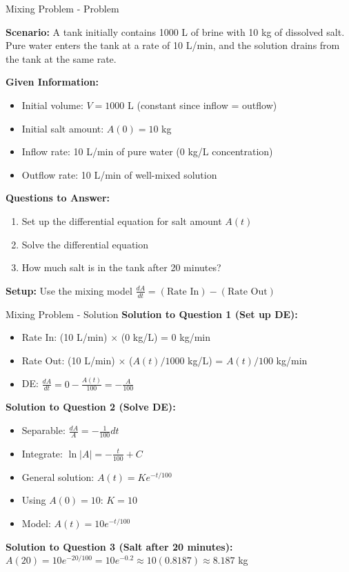 \documentclass[10pt,aspectratio=169]{beamer}
\begin{document}
\begin{frame}{Mixing Problem - Problem}
    \begin{problembox}
        \textbf{Scenario:} A tank initially contains 1000 L of brine with 10 kg of dissolved salt. Pure water enters the tank at a rate of 10 L/min, and the solution drains from the tank at the same rate.
        
        \textbf{Given Information:}
        \begin{itemize}
            \item Initial volume: $V = 1000$ L (constant since inflow = outflow)
            \item Initial salt amount: $A(0) = 10$ kg
            \item Inflow rate: 10 L/min of pure water (0 kg/L concentration)
            \item Outflow rate: 10 L/min of well-mixed solution
        \end{itemize}
        
        \textbf{Questions to Answer:}
        \begin{enumerate}
            \item Set up the differential equation for salt amount $A(t)$
            \item Solve the differential equation
            \item How much salt is in the tank after 20 minutes?
        \end{enumerate}
        
        \textbf{Setup:} Use the mixing model $\frac{dA}{dt} = (\text{Rate In}) - (\text{Rate Out})$
    \end{problembox}
\end{frame}

\begin{frame}{Mixing Problem - Solution}
    \textbf{Solution to Question 1 (Set up DE):}
    \begin{itemize}
        \item Rate In: (10 L/min) $\times$ (0 kg/L) = 0 kg/min
        \item Rate Out: (10 L/min) $\times$ ($A(t)/1000$ kg/L) = $A(t)/100$ kg/min
        \item DE: $\frac{dA}{dt} = 0 - \frac{A(t)}{100} = -\frac{A}{100}$
    \end{itemize}
    
    \textbf{Solution to Question 2 (Solve DE):}
    \begin{itemize}
        \item Separable: $\frac{dA}{A} = -\frac{1}{100} dt$
        \item Integrate: $\ln|A| = -\frac{t}{100} + C$
        \item General solution: $A(t) = Ke^{-t/100}$
        \item Using $A(0) = 10$: $K = 10$
        \item Model: $A(t) = 10e^{-t/100}$
    \end{itemize}
    
    \textbf{Solution to Question 3 (Salt after 20 minutes):}
    $A(20) = 10e^{-20/100} = 10e^{-0.2} \approx 10(0.8187) \approx 8.187$ kg
\end{frame}
\end{document}
